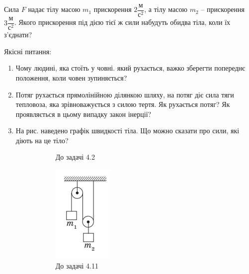 \justifying
\begin{problem}{1}
	Сила $F$ надає тілу масою $m_1$ прискорення $2 \dfrac{\text{м}}{\text{с}^2}$, а тілу масою $m_2$ -- прискорення $3 \dfrac{\text{м}}{\text{с}^2}$. Якого прискорення під дією тієї ж сили набудуть обидва тіла, коли їх з'єднати?
\end{problem}

\begin{problem}{2}
	Якісні питання:
	
	\begin{enumerate}
		\item Чому людині, яка стоїть у човні. який рухається, важко зберегти попереднє положення, коли човен зупиняється?
		
		\item Потяг рухається прямолінійною ділянкою шляху, на потяг діє сила тяги тепловоза, яка зрівноважується з силою тертя. Як рухається потяг? Як проявляється в цьому випадку закон інерції?
		
		\item На рис. наведено графік швидкості тіла. Що можно сказати про сили, які діють на це тіло?
		\begin{figure}[h!]
			\centering
			
			\begin{subfigure}{.4\textwidth}
			\caption{До задачі 4.2}
			\end{subfigure}
			\begin{subfigure}{.4\textwidth}
				\centering
				\includegraphics[width=0.5\linewidth]{class4/blocks}
				\caption{До задачі 4.11}
				\label{fig:blocks}
			\end{subfigure}			
			\caption{}
			\label{body}
		\end{figure}
	

\end{enumerate}
\end{problem}
